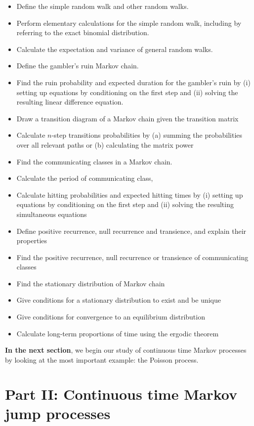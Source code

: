 \documentclass[
  a4paper,
]{article}
\theoremstyle{definition}
\theoremstyle{definition}
\theoremstyle{definition}
\theoremstyle{remark}
\begin{document}
\begin{itemize}
\item
  Define the simple random walk and other random walks.
\item
  Perform elementary calculations for the simple random walk, including by referring to the exact binomial distribution.
\item
  Calculate the expectation and variance of general random walks.
\item
  Define the gambler's ruin Markov chain.
\item
  Find the ruin probability and expected duration for the gambler's ruin by (i) setting up equations by conditioning on the first step and (ii) solving the resulting linear difference equation.
\item
  Draw a transition diagram of a Markov chain given the transition matrix
\item
  Calculate \(n\)-step transitions probabilities by (a) summing the probabilities over all relevant paths or (b) calculating the matrix power
\item
  Find the communicating classes in a Markov chain.
\item
  Calculate the period of communicating class,
\item
  Calculate hitting probabilities and expected hitting times by (i) setting up equations by conditioning on the first step and (ii) solving the resulting simultaneous equations
\item
  Define positive recurrence, null recurrence and transience, and explain their properties
\item
  Find the positive recurrence, null recurrence or transience of communicating classes
\item
  Find the stationary distribution of Markov chain
\item
  Give conditions for a stationary distribution to exist and be unique
\item
  Give conditions for convergence to an equilibrium distribution
\item
  Calculate long-term proportions of time using the ergodic theorem
\end{itemize}

\textbf{In the next section}, we begin our study of continuous time Markov processes by looking at the most important example: the Poisson process.

\hypertarget{part-part-ii-continuous-time-markov-jump-processes}{%
\part*{Part II: Continuous time Markov jump processes}\label{part-part-ii-continuous-time-markov-jump-processes}}
\end{document}
